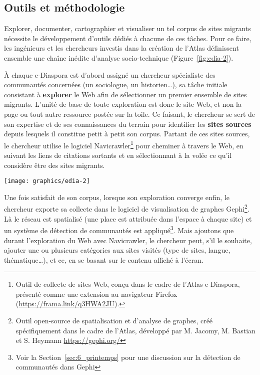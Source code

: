 \documentclass[symmetric,justified,marginals=raggedouter]{tufte-book}
\begin{document}
\subsection{Outils et méthodologie}

\noindent Explorer, documenter, cartographier et visualiser un tel corpus de sites migrants nécessite le développement d'outils dédiés à chacune de ces tâches. Pour ce faire, les ingénieurs et les chercheurs investis dans la création de l'Atlas définissent ensemble une chaîne inédite d'analyse socio-technique (Figure~\ref{fig:edia-2}). 

À chaque e-Diaspora est d'abord assigné un chercheur spécialiste des communautés concernées (un sociologue, un historien\ldots{}), sa tâche initiale consistant à \textbf{explorer} le Web afin de sélectionner un premier ensemble de sites migrants. L'unité de base de toute exploration est donc le site Web, et non la page ou tout autre ressource postée sur la toile. Ce faisant, le chercheur se sert de son expertise et de ses connaissances du terrain pour identifier les \textbf{sites sources} depuis lesquels il constitue petit à petit son corpus. Partant de ces sites sources, le chercheur utilise le logiciel Navicrawler\footnote{\RaggedOuter Outil de collecte de sites Web, conçu dans le cadre de l'Atlas e-Diaspora, présenté comme une extension au navigateur Firefox (\url{https://frama.link/q3HWA2JU}).} pour cheminer à travers le Web, en suivant les liens de citations sortants et en sélectionnant à la volée ce qu'il considère être des sites migrants.  

\begin{figure*}
  \texttt{[image: graphics/edia-2]}
  \caption{Chaîne d'analyse socio-technique de l'Atlas e-Diasporas (source~: M. Jacomy)}
  \label{fig:edia-2}
\end{figure*}

\noindent Une fois satisfait de son corpus, lorsque son exploration converge enfin, le chercheur exporte sa collecte dans le logiciel de visualisation de graphes Gephi\footnote{\RaggedOuter Outil open-source de spatialisation et d'analyse de graphes, créé spécifiquement dans le cadre de l'Atlas, développé par M. Jacomy, M. Bastian et S. Heymann \url{https://gephi.org/}}. Là le réseau est spatialisé (une place est attribuée dans l'espace à chaque site) et un système de détection de communautés est appliqué\footnote{\RaggedOuter Voir la Section~\ref{sec:6_printemps} pour une discussion sur la détection de communautés dans Gephi}. Mais ajoutons que durant l'exploration du Web avec Navicrawler, le chercheur peut, s'il le souhaite, ajouter une ou plusieurs catégories aux sites visités (type de sites, langue, thématique\ldots{}), et ce, en se basant sur le contenu affiché à l'écran. 
\end{document}
